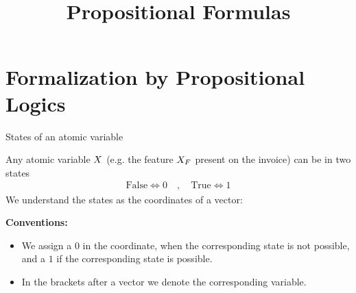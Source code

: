 \documentclass{beamer}
\title[Propositional Formulas]{
    \coursechapterone \\
    {\huge Propositional Formulas}
}
\begin{document}
{\frame[plain]{\titlepage}}
    \showoutlineatsection

    \section{Formalization by Propositional Logics}

    \begin{frame}{States of an atomic variable}

        Any atomic variable $X$ (e.g. the feature $X_{F}$ present on the invoice) can be in two states
        \begin{align*}
            \mathrm{False} \Leftrightarrow 0 \quad,\quad \mathrm{True} \Leftrightarrow 1
        \end{align*}
        We understand the states as the coordinates of a vector:
        \begin{center}
        \end{center}

        \textbf{Conventions:}
        \begin{itemize}
            \item We assign a $0$ in the coordinate, when the corresponding state is not possible, and a $1$ if the corresponding state is possible.
            \item In the brackets after a vector we denote the corresponding variable.
        \end{itemize}


    \end{frame}
\end{document}
